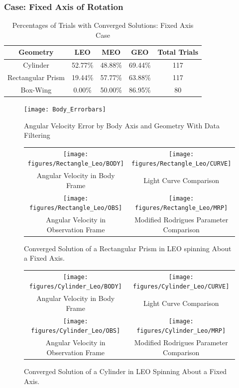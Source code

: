 \subsubsection{Case: Fixed Axis of Rotation}

\begin{table}[ht]
	\begin{center}
		\begin{tabular}{| c | c | c | c | c |}
			\hline Geometry & LEO & MEO & GEO & Total Trials\\ 
			\hline Cylinder & 52.77\% & 48.88\% & 69.44\% & 117 \\
			\hline Rectangular Prism & 19.44\% & 57.77\% & 63.88\% & 117\\
			\hline Box-Wing & 0.00\% & 50.00\% & 86.95\% & 80\\
			\hline
		\end{tabular}
	\end{center}
	\caption{Percentages of Trials with Converged Solutions: Fixed Axis Case}
\end{table}

\begin{figure}[ht]
	\begin{center}
		\texttt{[image: Body\_Errorbars]}
		\caption{Angular Velocity Error by Body Axis and Geometry With Data Filtering}
	\end{center}
\end{figure}

\begin{figure}
	\begin{tabular}{cc}
		\texttt{[image: figures/Rectangle\_Leo/BODY]} &
		\texttt{[image: figures/Rectangle\_Leo/CURVE]} \\
		Angular Velocity in Body Frame & Light Curve Comparison \\
		\texttt{[image: figures/Rectangle\_Leo/OBS]} &
		\texttt{[image: figures/Rectangle\_Leo/MRP]} \\
		Angular Velocity in Observation Frame & Modified Rodrigues Parameter Comparison
	\end{tabular}
	\caption{Converged Solution of a Rectangular Prism in LEO spinning About a Fixed Axis.}
\end{figure}


\begin{figure}
	\begin{tabular}{cc}
		\texttt{[image: figures/Cylinder\_Leo/BODY]} &
		\texttt{[image: figures/Cylinder\_Leo/CURVE]} \\
		Angular Velocity in Body Frame & Light Curve Comparison \\
		\texttt{[image: figures/Cylinder\_Leo/OBS]} &
		\texttt{[image: figures/Cylinder\_Leo/MRP]} \\
		Angular Velocity in Observation Frame & Modified Rodrigues Parameter Comparison
	\end{tabular}
	\caption{Converged Solution of a Cylinder in LEO Spinning About a Fixed Axis.}
\end{figure}

